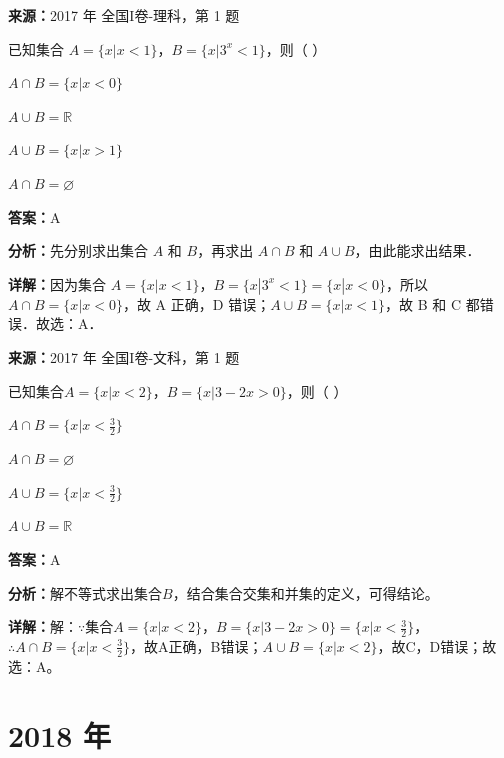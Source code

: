 \begin{question}[points=5]
\textbf{来源：}2017 年 全国I卷-理科，第 1 题\par
已知集合 $A=\{x|x<1\}$，$B=\{x|3^x<1\}$，则（ ）
\begin{choices}
  \item $A\cap B=\{x|x<0\}$
  \item $A\cup B=\mathbb{R}$
  \item $A\cup B=\{x|x>1\}$
  \item $A\cap B=\varnothing$
\end{choices}
\begin{solution}
\textbf{答案：}A

\textbf{分析：}先分别求出集合 $A$ 和 $B$，再求出 $A\cap B$ 和 $A\cup B$，由此能求出结果．

\textbf{详解：}因为集合 $A=\{x|x<1\}$，$B=\{x|3^x<1\}=\{x|x<0\}$，所以$A\cap B=\{x|x<0\}$，故 A 正确，D 错误；$A\cup B=\{x|x<1\}$，故 B 和 C 都错误．故选：A．
\end{solution}
\end{question}

\begin{question}[points=5]
\textbf{来源：}2017 年 全国I卷-文科，第 1 题\par
已知集合$A=\{x|x<2\}$，$B=\{x|3-2x>0\}$，则（        ）
\begin{choices}
  \item $A\cap B=\{x|x<\frac{3}{2}\}$
  \item $A\cap B=\varnothing$
  \item $A\cup B=\{x|x<\frac{3}{2}\}$
  \item $A\cup B=\mathbb{R}$
\end{choices}
\begin{solution}
\textbf{答案：}A

\textbf{分析：}解不等式求出集合$B$，结合集合交集和并集的定义，可得结论。

\textbf{详解：}解：$\because$集合$A=\{x|x<2\}$，$B=\{x|3-2x>0\}=\{x|x<\frac{3}{2}\}$，$\therefore A\cap B=\{x|x<\frac{3}{2}\}$，故A正确，B错误；$A\cup B=\{x|x<2\}$，故C，D错误；故选：A。
\end{solution}
\end{question}

\section*{2018 年}


